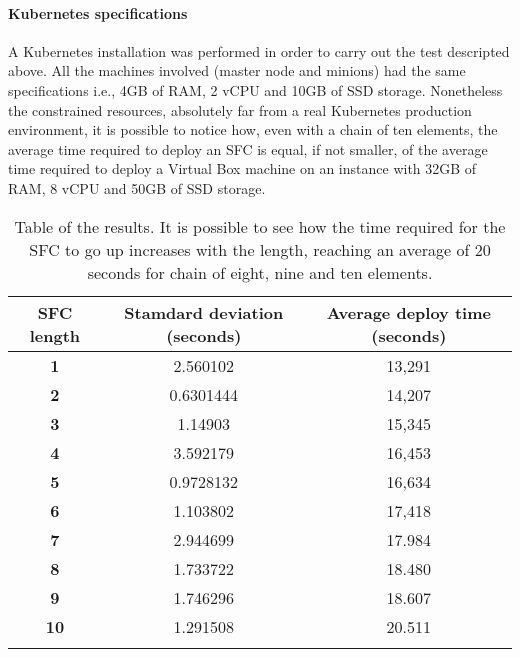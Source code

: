 \paragraph*{Kubernetes specifications}
A Kubernetes installation was performed in order to carry out the test
descripted above. All the machines involved (master node and minions) had the
same specifications i.e., 4GB of RAM, 2 vCPU and 10GB of SSD storage.
Nonetheless the constrained resources, absolutely far from a real Kubernetes
production environment, it is possible to notice how, even with a chain of ten
elements, the average time required to deploy an SFC is equal, if not smaller,
of the average time required to deploy a Virtual Box machine on an instance 
with 32GB of RAM, 8 vCPU and 50GB of SSD storage.

\begin{longtable}[c]{c|c|c}
\textbf{SFC length} & \textbf{Stamdard deviation (seconds)} & \textbf{Average 
deploy time (seconds)} \\ \hline
\endhead
%
\textbf{1}          & 2.560102                   & 13,291                     \\
\textbf{2}          & 0.6301444                  & 14,207                     \\
\textbf{3}          & 1.14903                    & 15,345                     \\
\textbf{4}          & 3.592179                   & 16,453                     \\
\textbf{5}          & 0.9728132                  & 16,634                     \\
\textbf{6}          & 1.103802                   & 17,418                     \\
\textbf{7}          & 2.944699                   & 17.984                     \\
\textbf{8}          & 1.733722                   & 18.480                     \\
\textbf{9}          & 1.746296                   & 18.607                     \\
\textbf{10}         & 1.291508                   & 20.511                     \\
\caption[SFC start up time]{Table of the results. It is possible to see how the
  time required for the SFC to go up increases with the length, reaching an
  average of 20 seconds for chain of eight, nine and ten elements.}
\label{chap:tests:sec:sfclength:tab:sfcdata}\\
\end{longtable}


